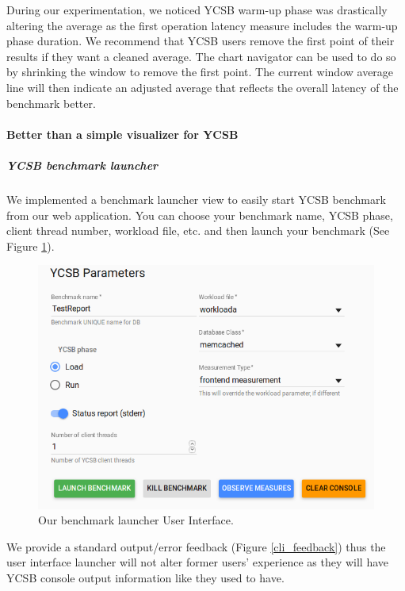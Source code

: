 \documentclass[a4paper,11pt]{report}
\begin{document}
During our experimentation, we noticed YCSB warm-up phase was drastically altering the average as the first operation latency measure includes the warm-up phase duration. We recommend that YCSB users remove the first point of their results if they want a cleaned average. The chart navigator can be used to do so by shrinking the window to remove the first point. The current window average line will then indicate an adjusted average that reflects the overall latency of the benchmark better.

\paragraph{Better than a simple visualizer for YCSB}

\subparagraph{YCSB benchmark launcher}

We implemented a benchmark launcher view to easily start YCSB benchmark from our web application. You can choose your benchmark name, YCSB phase, client thread number, workload file, etc. and then launch your benchmark (See Figure \ref{launcher_ui}).

\begin{figure}[ht]
\begin{center}
\includegraphics[width=1\linewidth]{images/launcher_ui.png}
\caption{Our benchmark launcher User Interface.}
\label{launcher_ui}
\end{center}
\end{figure}

We provide a standard output/error feedback (Figure \ref{cli_feedback}) thus the user interface launcher will not alter former users' experience as they will have YCSB console output information like they used to have.
\end{document}
